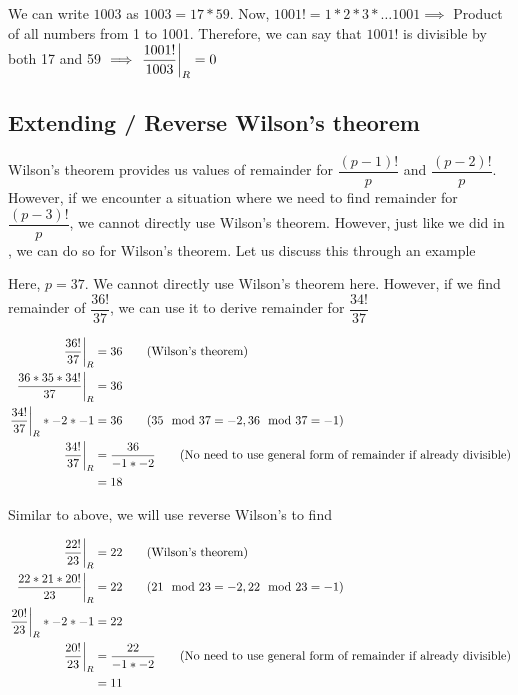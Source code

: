 We can write $1003$ as $1003 = 17 * 59$. Now, $1001! = 1 * 2 * 3 * \ldots 1001 \implies$ Product of all numbers from 1 to 1001. Therefore, we can say that $1001!$ is divisible by both 17 and 59 $\implies \displaystyle{ \left. \frac{1001!}{1003} \right |_{R} } = 0$

\subsection{Extending / Reverse Wilson's theorem} \label{reverse-wilson-p-minus-3}

Wilson's theorem provides us values of remainder for $\dfrac{(p-1)!}{p}$ and $\dfrac{(p-2)!}{p}$. However, if we encounter a situation where we need to find remainder for $\dfrac{(p-3)!}{p}$, we cannot directly use Wilson's theorem. However, just like we did in , we can do so for Wilson's theorem. Let us discuss this through an example


Here, $p = 37$. We cannot directly use Wilson's theorem here. However, if we find remainder of $\dfrac{36!}{37}$, we can use it to derive remainder for $\dfrac{34!}{37}$

\begin{align*}
    \displaystyle{ \left. \frac{36!}{37} \right |_{R} } &= 36 \tag{Wilson's theorem} \\
    \displaystyle{ \left. \frac{36 * 35 * 34!}{37} \right |_{R} } &= 36 \\
    \displaystyle{ \left. \frac{34!}{37} \right |_{R} } * -2 * -1 &= 36 \tag{$35 \mod 37 = -2, 36 \mod 37 = -1$} \\
    \displaystyle{ \left. \frac{34!}{37} \right |_{R} } &= \dfrac{36}{-1 * -2} \tag{No need to use general form of remainder if already divisible} \\
    &= 18
\end{align*}


Similar to above, we will use reverse Wilson's to find

\begin{align*}
    \displaystyle{ \left. \frac{22!}{23} \right |_{R} } &= 22 \tag{Wilson's theorem} \\
    \displaystyle{ \left. \frac{22 * 21 * 20!}{23} \right |_{R} } &= 22 \tag{$21 \mod 23 = -2, 22 \mod 23 = -1$} \\
    \displaystyle{ \left. \frac{20!}{23} \right |_{R} } * -2 * -1 &= 22 \\
    \displaystyle{ \left. \frac{20!}{23} \right |_{R} } &= \dfrac{22}{-1 * -2} \tag{No need to use general form of remainder if already divisible} \\
    &= 11
\end{align*}

